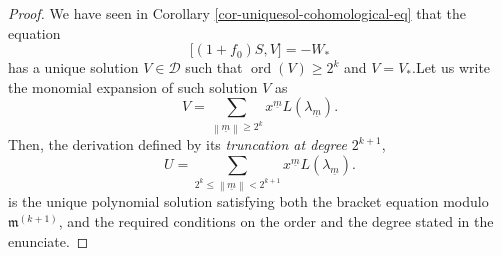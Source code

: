 \documentclass[10pt,twoside,reqno]{amsart}
\theoremstyle{remark}
\theoremstyle{remark}
\newcommand{\um}{{\underline m}}
\newcommand{\tmem}[1]{{\em #1\/}}
\newcommand{\tmop}[1]{{\operatorname{#1}}}
\newcommand{\cD}{\mathcal{D}}
\begin{document}
\begin{proof}
  We have seen in Corollary \ref{cor-uniquesol-cohomological-eq} that the
  equation
  \[ 
  \big[ (1 + f_0) S, V \big] = -W_{\ast} \]
  has a unique solution $V \in \cD$ such that $\tmop{ord} (V) \geqslant 2^k$
  and $V = V_{\ast}$.\quad Let us write the monomial expansion of such
  solution $V$ as
  \[ V = \sum_{\left\| \um \right\| \geqslant 2^k} x^{\um} L \left(
     \lambda_{\um} \right). \]
  Then, the derivation defined by its {\tmem{truncation at degree $2^{k +
  1}$}},
  \[ U = \sum_{2^k \leqslant \left\| \um \right\| < 2^{k + 1}} x^{\um} L
     \left( \lambda_{\um} \right).\]
  is the unique polynomial solution satisfying both the bracket equation modulo
  $\mathfrak{m }^{(k + 1)}$, and the required conditions on the order and the
  degree stated in the enunciate.
  

\end{proof}
\end{document}
